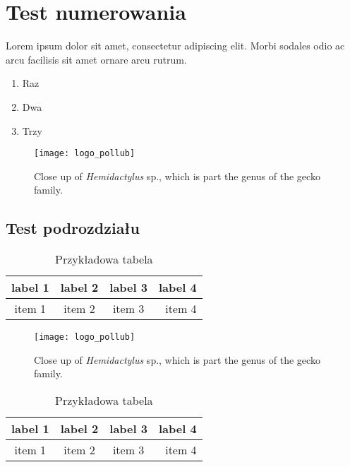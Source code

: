 \section{Test numerowania}

Lorem ipsum dolor sit amet, consectetur adipiscing elit.\cite{test1} Morbi sodales odio ac arcu facilisis sit amet ornare arcu rutrum.\cite{test1,test2}

\begin{enumerate}
  \item{Raz}
  \item{Dwa}
  \item{Trzy}
\end{enumerate}

\lipsum[2]

\begin{figure}[ht]
  \centering
  \texttt{[image: logo\_pollub]}
  \caption[Close up of \textit{Hemidactylus} sp.]%
  {Close up of \textit{Hemidactylus} sp., which is
  part the genus of the gecko family.}
\end{figure}

\subsection{Test podrozdziału}

\lipsum[3]

\begin{table}[h]
  \center
  \caption{Przykładowa tabela}
  \label{my_table}
  \begin{tabular}{ | c | c | c | r | }
    \hline
  label 1 & label 2 & label 3 & label 4 \\
  \hline
  item 1  & item 2  & item 3  & item 4  \\
  \hline
  \end{tabular}
\end{table}

\lipsum[4]

\begin{figure}[ht]
  \centering
  \texttt{[image: logo\_pollub]}
  \caption[Close up of \textit{Hemidactylus} sp.]%
  {Close up of \textit{Hemidactylus} sp., which is
  part the genus of the gecko family.}
\end{figure}

\lipsum[5]

\begin{table}[h]
  \center
  \caption{Przykładowa tabela}
  \label{my_table}
  \begin{tabular}{ | c | c | c | r | }
    \hline
  label 1 & label 2 & label 3 & label 4 \\
  \hline
  item 1  & item 2  & item 3  & item 4  \\
  \hline
  \end{tabular}
\end{table}

